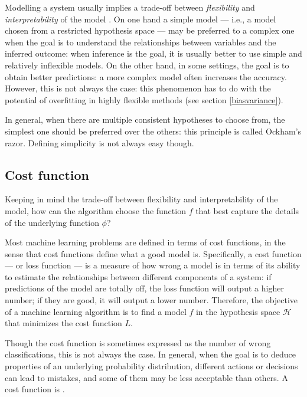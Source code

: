             Modelling a system usually implies a trade-off between \emph{flexibility} and \emph{interpretability} of the model \cite[24--26]{James}. On one hand a simple model --- i.e., a model chosen from a restricted hypothesis space --- may be preferred to a complex one when the goal is to understand the relationships between variables and the inferred outcome: when inference is the goal, it is usually better to use simple and relatively inflexible models. On the other hand, in some settings, the goal is to obtain better predictions: a more complex model often increases the accuracy. However, this is not always the case: this phenomenon has to do with the potential of overfitting in highly flexible methods (see section \ref{biasvariance}).
            
            In general, when there are multiple consistent hypotheses to choose from, the simplest one should be preferred over the others: this principle is called Ockham's razor. Defining simplicity is not always easy though.
        \subsection{Cost function}
            Keeping in mind the trade-off between flexibility and interpretability of the model, how can the algorithm choose the function \(f\) that best capture the details of the underlying function \(\phi\)?
            
            Most machine learning problems are defined in terms of cost functions, in the sense that cost functions define what a good model is. Specifically, a cost function --- or loss function --- is a measure of how wrong a model is in terms of its ability to estimate the relationships between different components of a system: if predictions of the model are totally off, the loss function will output a higher number; if they are good, it will output a lower number. Therefore, the objective of a machine learning algorithm is to find a model \(f\) in the hypothesis space \(\mathcal{H}\) that minimizes the cost function \(L\).
            
            Though the cost function is sometimes expressed as the number of wrong classifications, this is not always the case. In general, when the goal is to deduce properties of an underlying probability distribution, different actions or decisions can lead to mistakes, and some of them may be less acceptable than others. A cost function is  \cite[41]{Bishop}.
            
